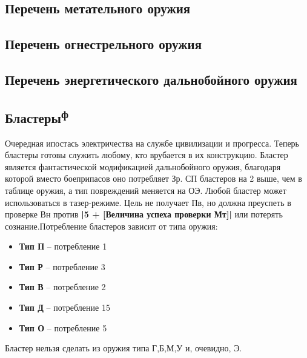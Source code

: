 
\newpage
\subsection{Перечень метательного оружия}

\newpage
\subsection{Перечень огнестрельного оружия}

\newpage
\subsection{Перечень энергетического дальнобойного оружия}

\newpage
\subsection{Бластеры\textsuperscript{ф}}
Очередная ипостась электричества на службе цивилизации и прогресса. Теперь бластеры готовы служить любому, кто врубается в их конструкцию.
\newline Бластер является фантастической модификацией дальнобойного оружия, благодаря которой вместо боеприпасов оно потребляет Зр. СП бластеров на 2 выше, чем в таблице оружия, а тип повреждений меняется на ОЭ.
\newline Любой бластер может использоваться в тазер-режиме. Цель не получает Пв, но должна преуспеть в проверке Вн против \textbf{|5 + [Величина успеха проверки Мт]|} или потерять сознание.\newline Потребление бластеров зависит от типа оружия:
\begin{itemize}
\item \textbf{Тип П} -- потребление 1
\item \textbf{Тип Р} -- потребление 3
\item \textbf{Тип В} -- потребление 2
\item \textbf{Тип Д} -- потребление 15
\item \textbf{Тип О} -- потребление 5
\end{itemize}
Бластер нельзя сделать из оружия типа Г,Б,М,У и, очевидно, Э.%

\printindex[weapons]



